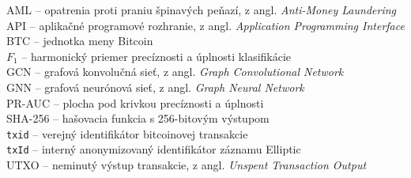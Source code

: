 AML -- opatrenia proti praniu špinavých peňazí, z angl. \emph{Anti-Money Laundering}\\
API -- aplikačné programové rozhranie, z angl. \emph{Application Programming Interface}\\
BTC -- jednotka meny Bitcoin\\
$F_1$ -- harmonický priemer precíznosti a úplnosti klasifikácie\\
GCN -- grafová konvolučná sieť, z angl. \emph{Graph Convolutional Network}\\
GNN -- grafová neurónová sieť, z angl. \emph{Graph Neural Network}\\
PR-AUC -- plocha pod krivkou precíznosti a úplnosti\\
SHA-256 -- hašovacia funkcia s 256-bitovým výstupom\\
\texttt{txid} -- verejný identifikátor bitcoinovej transakcie\\
\texttt{txId} -- interný anonymizovaný identifikátor záznamu Elliptic\\
UTXO -- neminutý výstup transakcie, z angl. \emph{Unspent Transaction Output}
